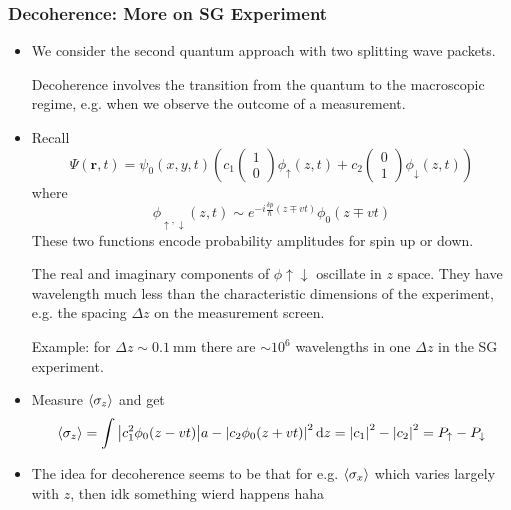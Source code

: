 \documentclass[11pt, a4paper]{article}
\newcommand{\diff}{\mathop{}\!\mathrm{d}} %
\renewcommand{\vec}[1]{\bm{#1}}  %
\newcommand{\ua}{\uparrow}  %
\newcommand{\da}{\downarrow}  %
\renewcommand{\r}{\vec{r}}  %
\begin{document}
\subsubsection{Decoherence: More on SG Experiment}
\begin{itemize}
    \item We consider the second quantum approach with two splitting wave packets. 

    Decoherence involves the transition from the quantum to the macroscopic regime, e.g. when we observe the outcome of a measurement.

    \item Recall
    \begin{equation*}
        \Psi(\r, t) = \psi_{0}(x, y, t) \left( c_{1}
        \begin{pmatrix}
            1\\
            0
        \end{pmatrix}\phi_{\ua}(z, t)
        + c_{2}
        \begin{pmatrix}
            0\\
            1
        \end{pmatrix}
        \phi_{\da}(z, t) \right)
    \end{equation*}
    where
    \begin{equation*}
        \phi_{\ua, \da} (z, t) \sim e^{-i \frac{\delta p}{\hbar} (z \mp vt)} \phi_{0}(z \mp vt)
    \end{equation*}
    These two functions encode probability amplitudes for spin up or down. 
    
    The real and imaginary components of $ \phi{\ua \da} $ oscillate in $ z $ space. They have wavelength much less than the characteristic dimensions of the experiment, e.g. the spacing $ \Delta z $ on the measurement screen. 

    Example: for $ \Delta z \sim \SI{0.1}{\milli \meter} $ there are $ \sim 10^{6} $ wavelengths in one $ \Delta z $ in the SG experiment.
    
    \item Measure $ \ev{\sigma_{z}} $ and get
    \begin{equation*}
        \ev{\sigma_{z}}  = \int \abs{c_{1}^{2} \phi_{0} (z - vt)}a - \abs{c_{2} \phi_{0} (z + vt)}^{2} \diff z = \abs{c_{1}}^{2} - \abs{c_{2}}^{2} = P_{\ua} - P_{\da}
    \end{equation*}

    \item The idea for decoherence seems to be that for e.g. $ \ev{\sigma_{x}} $ which varies largely with $ z $, then idk something wierd happens haha 
   
    
\end{itemize}
\end{document}
